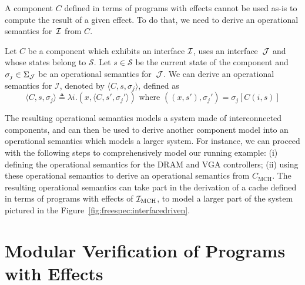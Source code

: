 A component $C$ defined in terms of programs with effects cannot be used as-is
to compute the result of a given effect.
%
To do that, we need to derive an operational semantics for~$\mathcal{I}$ from $C$.

\begin{definition} \label{def:freespec:derivation} Let $C$ be a component which
  exhibits an interface $\mathcal{I}$, uses an interface~$\mathcal{J}$ and whose states belong to
  $\mathcal{S}$.
  Let $s \in \mathcal{S}$ be the current state of the component and
  $\sigma_j \in \Sigma_{\mathcal{J}}$ be an operational semantics for~$\mathcal{J}$.
  We can derive an operational semantics for $\mathcal{I}$, denoted by
  $\langle C, s, \sigma_j \rangle$, defined as
  \[ \langle C, s, \sigma_j \rangle \triangleq \lambda i. (x, \langle C, s',
    \sigma_j' \rangle) \text{ where } ((x, s'), \sigma_j') = \sigma_j[C (i, s)]
  \]
\end{definition}

%
The resulting operational semantics models a system made of interconnected
components, and can then be used to derive another component model into an
operational semantics which models a larger system.
%
For instance, we can proceed with the following steps to comprehensively model
our running example: (i) defining the operational semantics for the DRAM and VGA
controllers; (ii) using these operational semantics to derive an operational
semantics from $C_{\mathrm{MCH}}$.
%
The resulting operational semantics can take part in the derivation of a cache
defined in terms of programs with effects of $\mathcal{I}_{\mathrm{MCH}}$, to model a
larger part of the system pictured in the
Figure~\ref{fig:freespec:interfacedriven}.

\section{Modular Verification of Programs with Effects}
\label{sec:freespec:verifying}

